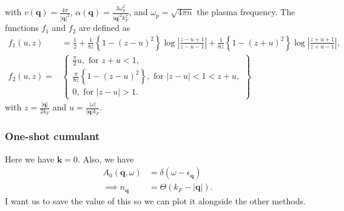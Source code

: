 with $v(\mathbf{q})=\frac{4\pi}{|\mathbf{q}|^2}$, $\alpha(\mathbf{q})=\frac{3\omega_p^2}{|\mathbf{q}|^2 k_F^2}$, and $\omega_p=\sqrt{4\pi n}$ the plasma frequency. The functions $f_1$ and $f_2$ are defined as
\begin{align}
f_1(u, z) & =\frac{1}{2}+\frac{1}{8 z}\left\{1-(z-u)^2\right\} \log \left|\frac{z-u+1}{z-u-1}\right|
+\frac{1}{8 z}\left\{1-(z+u)^2\right\} \log \left|\frac{z+u+1}{z+u-1}\right|,  \\
f_2(u, z)= & \left\{\begin{array}{l}
\frac{\pi}{2} u, \text { for } z+u<1, \\
\frac{\pi}{8 z}\left\{1-(z-u)^2\right\}, \text { for }|z-u|<1<z+u, \\
0, \text { for }|z-u|>1 .
\end{array}\right\}
\end{align}
with $z =\frac{|\mathbf{q}|}{2 k_F}$ and $u =\frac{|\omega|}{|\mathbf{q}| k_F}$.
\subsubsection{One-shot cumulant}
 Here we have $\bm{k}=0$. Also, we have 
\begin{align}
    A_0(\mathbf{q}, \omega) &= \delta\left(\omega-\epsilon_{\bm{q}}\right) \\
\implies n_{\mathbf{q}} &= \Theta\left(k_F-|\mathbf{q}|\right).
\end{align}
I want us to save the value of this so we can plot it alongside the other methods. 
